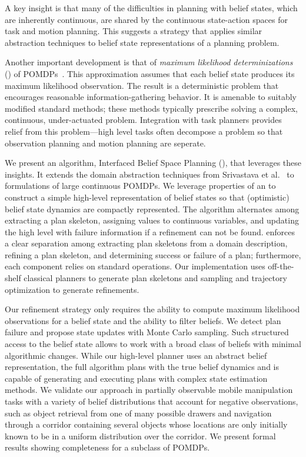 A key insight is that many of the difficulties in planning with belief
states, which are inherently continuous, are shared by the continuous
state-action spaces for task and motion planning. This suggests a
strategy that applies similar abstraction techniques to belief state
representations of a planning problem.

Another important development is that of \emph{maximum likelihood
  determinizations} (\mld) of POMDPs~\cite{platt2010belief}. This
approximation assumes that each belief state produces its maximum
likelihood observation. The result is a deterministic problem that
encourages reasonable information-gathering behavior. It is amenable
to suitably modified standard methods; these methods typically
prescribe solving a complex, continuous, under-actuated
problem. Integration with task planners provides relief from this
problem---high level tasks often decompose a problem so that
observation planning and motion planning are seperate.

We present an algorithm, Interfaced Belief Space Planning (\ibsp),
that leverages these insights. It extends the domain abstraction
techniques from Srivastava et al.~\cite{srivastava2014combined} to
\mld{} formulations of large continuous POMDPs. We leverage properties
of an \mld{} to construct a simple high-level representation of belief
states so that (optimistic) belief state dynamics are compactly
represented. The algorithm alternates among extracting a plan
skeleton, assigning values to continuous variables, and updating the
high level with failure information if a refinement can not be found.
\ibsp{} enforces a clear separation among extracting plan skeletons
from a domain description, refining a plan skeleton, and determining
success or failure of a plan; furthermore, each component relies on
standard operations. Our implementation uses off-the-shelf classical
planners to generate plan skeletons and sampling and trajectory
optimization to generate refinements.

Our refinement strategy only requires the ability to compute maximum
likelihood observations for a belief state and the ability to filter
beliefs. We detect plan failure and propose state updates with Monte Carlo
sampling. Such structured access to the belief state allows \ibsp{} to work with a broad class
of beliefs with minimal algorithmic changes. While our high-level
planner uses an abstract belief representation, the full algorithm
plans with the true belief dynamics and is capable of generating and executing plans
with complex state estimation methods. We validate our approach in
partially observable mobile manipulation tasks with a variety of
belief distributions that account for negative observations, such as object retrieval from
one of many possible drawers and navigation through a corridor containing several objects
whose locations are only initially known to be in a uniform distribution over the corridor. We
present formal results showing completeness for a subclass of POMDPs.

